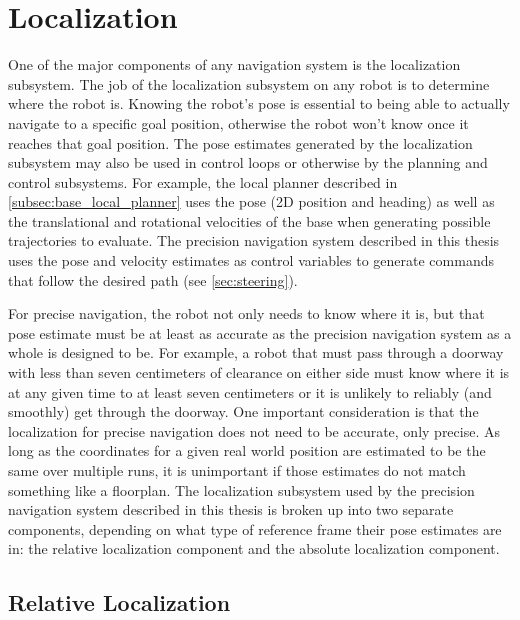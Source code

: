 \section{Localization}\label{sec:localization}

One of the major components of any navigation system is the localization subsystem. The job of the localization subsystem on any robot is to determine where the robot is. Knowing the robot's pose is essential to being able to actually navigate to a specific goal position, otherwise the robot won't know once it reaches that goal position. The pose estimates generated by the localization subsystem may also be used in control loops or otherwise by the planning and control subsystems. For example, the local planner described in \autoref{subsec:base_local_planner} uses the pose (2D position and heading) as well as the translational and rotational velocities of the base when generating possible trajectories to evaluate. The precision navigation system described in this thesis uses the pose and velocity estimates as control variables to generate commands that follow the desired path (see \autoref{sec:steering}).

For precise navigation, the robot not only needs to know where it is, but that pose estimate must be at least as accurate as the precision navigation system as a whole is designed to be. For example, a robot that must pass through a doorway with less than seven centimeters of clearance on either side must know where it is at any given time to at least seven centimeters or it is unlikely to reliably (and smoothly) get through the doorway. One important consideration is that the localization for precise navigation does not need to be accurate, only precise. As long as the coordinates for a given real world position are estimated to be the same over multiple runs, it is unimportant if those estimates do not match something like a floorplan. The localization subsystem used by the precision navigation system described in this thesis is broken up into two separate components, depending on what type of reference frame their pose estimates are in: the relative localization component and the absolute localization component.

\subsection{Relative Localization}\label{subsec:relative_localization}

